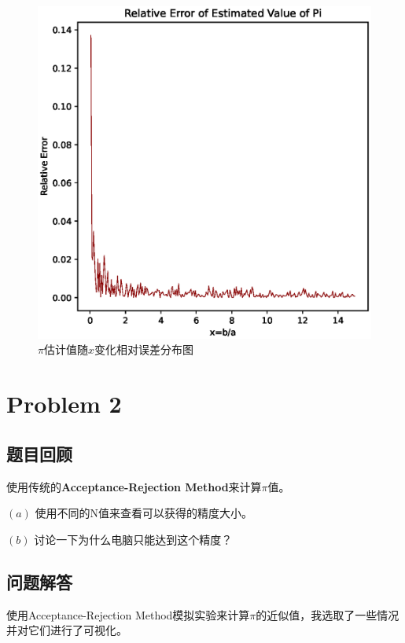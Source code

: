 \documentclass[12pt,a4paper]{article}%
\begin{document}
\begin{figure}[H]
\begin{minipage}{0.48\textwidth}
        \includegraphics[width=1.1\textwidth]{Pi长短针估计值相对误差.eps}
        \caption{\fontsize{10pt}{15pt}\selectfont $\pi$估计值随$x$变化相对误差分布图}
    \end{minipage}\label{fig:figure2}
\end{figure}

\section{Problem 2}
\subsection{题目回顾}
使用传统的\textbf{Acceptance-Rejection Method}来计算$\pi$值。

$\left(a\right)$ 使用不同的N值来查看可以获得的精度大小。

$\left(b\right)$ 讨论一下为什么电脑只能达到这个精度？

\subsection{问题解答}

使用Acceptance-Rejection Method模拟实验来计算$\pi$的近似值，我选取了一些情况并对它们进行了可视化。
\end{document}
